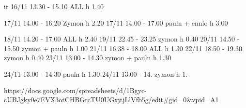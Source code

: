 it 	16/11   13.30 - 15.10   ALL                 h 1.40
	
	17/11	14.00 - 16.20   Zymon               h 2.20
	17/11   14.00 - 17.00   pauln + ennio       h 3.00
	
	18/11   14.20 - 17.00   ALL                 h 2.40
	19/11   22.45 - 23.25   zymon               h 0.40
    20/11   14.50 - 15.50   zymon + pauln       h 1.00
    21/11   16.38 - 18.00   ALL                 h 1.30
    22/11   18.50 - 19.30   zymon               h 0.40
    23/11   13.00 - 14.30   zymon + pauln       h 1.30
    
    24/11   13.00 - 14.30   pauln               h 1.30
    24/11   13.00 - 14.       zymon               h 1.
    
    
    https://docs.google.com/spreadsheets/d/1Bgyc-cUBJgky0e7EVX3otCHBGrcTU0UGxjtjLlVfb5g/edit#gid=0&vpid=A1